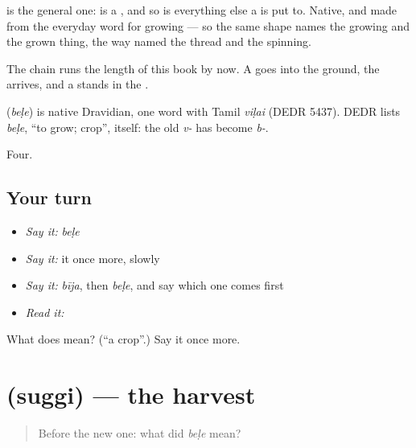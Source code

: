  is the general one:  is a , and so is everything else a  is put to. Native, and made from the everyday word for growing — so the same shape names the growing and the grown thing, the way  named the thread and the spinning.

The chain runs the length of this book by now. A  goes into the ground, the  arrives, and a  stands in the .

\begin{cousinweb}
\textbf{} (\emph{beḷe}) is native Dravidian, one word with Tamil \emph{viḷai} (DEDR 5437). DEDR lists \emph{beḷe}, \textquotedblleft{}to grow; crop\textquotedblright{}, itself: the old \emph{v-} has become \emph{b-}.
\end{cousinweb}

\begin{grammarlens}[title={What you've built}]
Four.
\end{grammarlens}

\subsection*{Your turn}
\begin{itemize}
\raggedright
  \item \emph{Say it:} \emph{beḷe}
  \item \emph{Say it:} it once more, slowly
  \item \emph{Say it:} \emph{bīja}, then \emph{beḷe}, and say which one comes first
  \item \emph{Read it:} \textbf{}
\end{itemize}

\begin{tcolorbox}[breakable,colback=teal!4,colframe=teal!35!black,title={Before you move on}]
What does  mean? (\textquotedblleft{}a crop\textquotedblright{}.) Say it once more.
\end{tcolorbox}
\section[\texorpdfstring{\kn{ಸುಗ್ಗಿ} (suggi)}{ಸುಗ್ಗಿ (suggi)}]{ (suggi) — the harvest}

\label{lesson:KA-C66-harvest}



\begin{quote}
Before the new one: what did \emph{beḷe} mean?
\end{quote}

